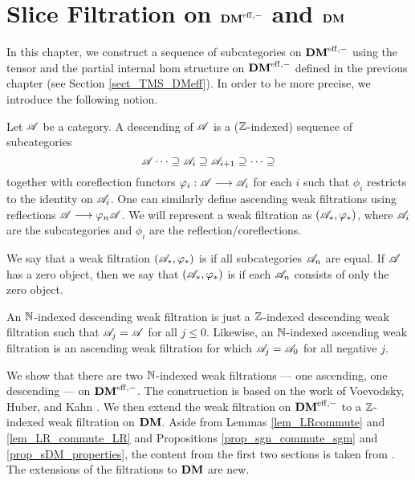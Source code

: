 \newpage
\chapter{Slice Filtration on $\mathbf{DM}^{\mathrm{eff},-}$ and $\mathbf{DM}$}\label{sect_slice_filt_dm}

In this chapter, we construct a sequence of subcategories on 
$\mathbf{DM}^{\mathrm{eff},-}$ using the tensor and the partial internal hom structure 
on $\mathbf{DM}^{\mathrm{eff},-}$ defined in the previous chapter (see Section 
\ref{sect_TMS_DMeff}). In order to be more precise, we introduce
the following notion.

\begin{defn}\label{def_cat_filtration}
Let $\mathscr{A}$ be a category. A descending  of 
$\mathscr{A}$ is a ($\mathbb{Z}$-indexed) sequence of subcategories
\[
\mathscr{A} \cdots \supseteq \mathscr{A}_i \supseteq \mathscr{A}_{i + 1}
   \supseteq \cdots \supseteq 
\]
together with coreflection functors $\varphi_i: \mathscr{A} \longrightarrow \mathscr{A}_i$
for each $i$ such that $\phi_i$ restricts to the identity on
$\mathscr{A}_i$. One can similarly define ascending weak filtrations using
reflections $\mathscr{A} \longrightarrow \varphi_n\mathscr{A}$. We will represent a weak
filtration as $(\mathscr{A}_*, \varphi_*)$, where $\mathscr{A}_i$ are the
subcategories and $\phi_i$ are the reflection/coreflections.

We say that a weak filtration $(\mathscr{A}_*, \varphi_*)$ is 
 if all subcategories $\mathscr{A}_n$ are equal. If
$\mathscr{A}$ has a zero object, then we say that $(\mathscr{A}_*, \varphi_*)$
is  if each $\mathscr{A}_n$ consists of only the zero object.
\end{defn}

\begin{rmk}
An $\mathbb{N}$-indexed descending weak filtration is just a $\mathbb{Z}$-indexed 
descending weak filtration such that $\mathscr{A}_j = \mathscr{A}$
for all $j \leq 0$. Likewise, an $\mathbb{N}$-indexed ascending 
weak filtration is an ascending weak filtration for which
$\mathscr{A}_j = \mathscr{A}_0$ for all negative $j$.
\end{rmk}

We show that there are two $\mathbb{N}$-indexed weak filtrations --- 
one ascending, one descending --- on $\mathbf{DM}^{\mathrm{eff},-}$. The construction 
is based on the work of Voevodsky, Huber, and Kahn \cite{HuKa}. 
We then extend the weak filtration on $\mathbf{DM}^{\mathrm{eff},-}$ to a $\mathbb{Z}$-indexed
weak filtration on $\mathbf{DM}$. Aside from Lemmas \ref{lem_LRcommute} 
and \ref{lem_LR_commute_LR} and Propositions 
\ref{prop_sgn_commute_sgm} and \ref{prop_sDM_properties}, the 
content from the first two sections is taken from 
\cite[\S 1]{HuKa}. The extensions of the filtrations to $\mathbf{DM}$ are 
new.

